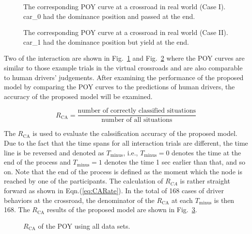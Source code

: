 \begin{figure}[htbp!]
\begin{center}
\end{center}
\caption{The corresponding POY curve at a crossroad in real world (Case I). car\_0 had the dominance position and passed at the end.}
\label{fig:POY_caseI} 
\end{figure}


\begin{figure}[htbp!]
\begin{center}
\end{center}
\caption{The corresponding POY curve at a crossroad in real world (Case II). car\_1 had the dominance position but yield at the end.}
\label{fig:POY_caseII} 
\end{figure}


Two of the interaction are shown in Fig.~\ref{fig:POY_caseI} and Fig.~\ref{fig:POY_caseII} where the POY curves are similar to those example trials in the virtual crossroads and are also comparable to human drivers' judgements. After examining the performance of the proposed model by comparing the POY curves to the predictions of human drivers, the accuracy of the proposed model will be examined.

\begin{equation}
    R_{\mathrm{CA}} = \frac{\text{number of correctly classified situations}}{\text{number of all situations}}
\label{eq:CARate}
\end{equation}

The $R_{\mathrm{CA}}$ is used to evaluate the calssification accuracy of the proposed model. Due to the fact that the time spans for all interaction trials are different, the time line is be reversed and denoted as $T_{\mathrm{minus}}$, i.e., $T_{\mathrm{minus}}=0$ denotes the time at the end of the process and $T_{\mathrm{minus}}=1$ denotes the time 1 sec earlier than that, and so on. Note that the end of the process is defined as the moment which the node is reached by one of the participants. The calculation of $R_{CA}$ is rather straight forward as shown in Eqn.(\ref{eq:CARate}). In the total of 168 cases of driver behaviors at the crossroad, the denominator of the $R_{\mathrm{CA}}$ at each $T_{\mathrm{minus}}$ is then 168. The $R_{\mathrm{CA}}$ results of the proposed model are shown in Fig.~\ref{fig:CARPOY}.

\begin{figure}[htbp!]
\begin{center}
\end{center}
\caption{$R_{\mathrm{CA}}$ of the POY using all data sets.}
\label{fig:CARPOY} 
\end{figure}

